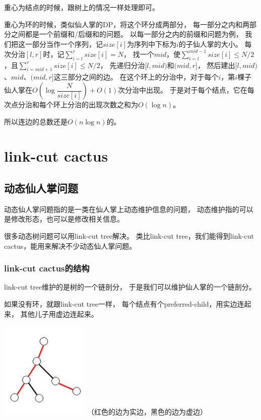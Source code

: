 \documentclass{noithesis}
\begin{document}
重心为结点的时候，跟树上的情况一样处理即可。

重心为环的时候，类似仙人掌的DP，将这个环分成两部分，
每一部分之内和两部分之间都是一个前缀和/后缀和的问题。
以每一部分之内的前缀和问题为例，
我们把这一部分当作一个序列，记$size[i]$为序列中下标为$i$的子仙人掌的大小。
每次分治$[l,r]$时，记$\sum_{i=l}^{r} size[i] = N$，
找一个$mid$，使$\sum_{i=l}^{mid-1} size[i] \le N/2$，且$\sum_{i=mid+1}^{r} size[i] \le N/2$，
先递归分治$[l,mid)$和$(mid,r]$，
然后建出$[l,mid)$、$mid$、$(mid,r]$这三部分之间的边。
在这个环上的分治中，对于每个$i$，第$i$棵子仙人掌在$O(\log \dfrac{N}{size[i]}) + O(1)$次分治中出现。
于是对于每个结点，它在每次点分治和每个环上分治的出现次数之和为$O(\log n)$。

所以连边的总数还是$O(n \log n)$的。


\section{link-cut cactus}

\subsection{动态仙人掌问题}

动态仙人掌问题指的是一类在仙人掌上动态维护信息的问题，
动态维护指的可以是修改形态，也可以是修改相关信息。


很多动态树问题可以用link-cut tree解决。
类比link-cut tree，我们能得到link-cut cactus，能用来解决不少动态仙人掌问题。


\text{}

\subsubsection{link-cut cactus的结构}


link-cut tree维护的是树的一个链剖分，
于是我们可以维护仙人掌的一个链剖分。


\newpage

如果没有环，就跟link-cut tree一样，
每个结点有个preferred-child，用实边连起来，
其他儿子用虚边连起来。

\includegraphics[width=120.33pt,height=132pt]{images/lcc-normal.png}
（红色的边为实边，黑色的边为虚边）
\end{document}
